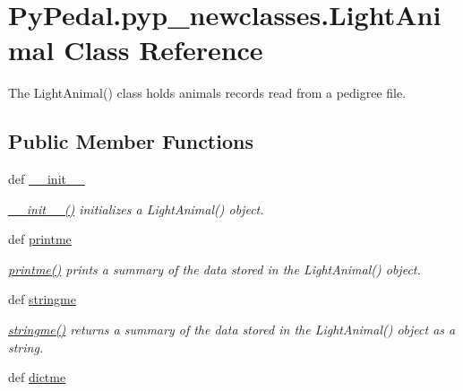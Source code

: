 \hypertarget{classPyPedal_1_1pyp__newclasses_1_1LightAnimal}{
\section{PyPedal.pyp\_\-newclasses.LightAnimal Class Reference}
\label{classPyPedal_1_1pyp__newclasses_1_1LightAnimal}
}


The LightAnimal() class holds animals records read from a pedigree file.  


\subsection*{Public Member Functions}
\begin{DoxyCompactItemize}
\item 
def \hyperlink{classPyPedal_1_1pyp__newclasses_1_1LightAnimal_aa410001c85ab942a73f9d4be4148ccc2}{\_\-\_\-init\_\-\_\-}
\begin{DoxyCompactList}\small\item\em \hyperlink{classPyPedal_1_1pyp__newclasses_1_1LightAnimal_aa410001c85ab942a73f9d4be4148ccc2}{\_\-\_\-init\_\-\_\-()} initializes a LightAnimal() object. \item\end{DoxyCompactList}\item 
def \hyperlink{classPyPedal_1_1pyp__newclasses_1_1LightAnimal_aced172e326bbcc039d74541f3736b7af}{printme}
\begin{DoxyCompactList}\small\item\em \hyperlink{classPyPedal_1_1pyp__newclasses_1_1LightAnimal_aced172e326bbcc039d74541f3736b7af}{printme()} prints a summary of the data stored in the LightAnimal() object. \item\end{DoxyCompactList}\item 
def \hyperlink{classPyPedal_1_1pyp__newclasses_1_1LightAnimal_a609e38ea9b8033460b7adf96dad95e17}{stringme}
\begin{DoxyCompactList}\small\item\em \hyperlink{classPyPedal_1_1pyp__newclasses_1_1LightAnimal_a609e38ea9b8033460b7adf96dad95e17}{stringme()} returns a summary of the data stored in the LightAnimal() object as a string. \item\end{DoxyCompactList}\item 
def \hyperlink{classPyPedal_1_1pyp__newclasses_1_1LightAnimal_a8016e0f0ce7359a441f944668ec312be}{dictme}

\end{DoxyCompactItemize}
